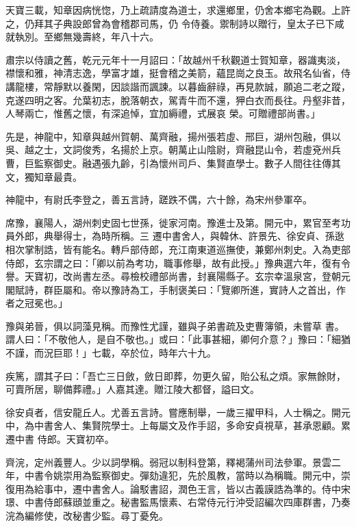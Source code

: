 \begin{pinyinscope}
 天寶三載，知章因病恍惚，乃上疏請度為道士，求還鄉里，仍舍本鄉宅為觀。上許之，仍拜其子典設郎曾為會稽郡司馬，仍
 令侍養。禦制詩以贈行，皇太子已下咸就執別。至鄉無幾壽終，年八十六。



 肅宗以侍讀之舊，乾元元年十一月詔曰：「故越州千秋觀道士賀知章，器識夷淡，襟懷和雅，神清志逸，學富才雄，挺會稽之美箭，蘊昆崗之良玉。故飛名仙省，侍講龍樓，常靜默以養閑，因談諧而諷諫。以暮齒辭祿，再見款誠，願追二老之蹤，克遂四明之客。允葉初志，脫落朝衣，駕青牛而不還，狎白衣而長往。丹壑非昔，人琴兩亡，惟舊之懷，有深追悼，宜加縟禮，式展哀
 榮。可贈禮部尚書。」



 先是，神龍中，知章與越州賀朝、萬齊融，揚州張若虛、邢巨，湖州包融，俱以吳、越之士，文詞俊秀，名揚於上京。朝萬止山陰尉，齊融昆山令，若虛兗州兵曹，巨監察御史。融遇張九齡，引為懷州司戶、集賢直學士。數子人間往往傳其文，獨知章最貴。



 神龍中，有尉氏李登之，善五言詩，蹉跌不偶，六十餘，為宋州參軍卒。



 席豫，襄陽人，湖州刺史固七世孫，徙家河南。豫進士及第。開元中，累官至考功員外郎，典舉得士，為時所稱。三
 遷中書舍人，與韓休、許景先、徐安貞、孫逖相次掌制誥，皆有能名。轉戶部侍郎，充江南東道巡撫使，兼鄭州刺史。入為吏部侍郎，玄宗謂之曰：「卿以前為考功，職事修舉，故有此授。」豫典選六年，復有令譽。天寶初，改尚書左丞。尋檢校禮部尚書，封襄陽縣子。玄宗幸溫泉宮，登朝元閣賦詩，群臣屬和。帝以豫詩為工，手制褒美曰：「覽卿所進，實詩人之首出，作者之冠冕也。」



 豫與弟晉，俱以詞藻見稱。而豫性尤謹，雖與子弟書疏及吏曹簿領，未嘗草
 書。謂人曰：「不敬他人，是自不敬也。」或曰：「此事甚細，卿何介意？」豫曰：「細猶不謹，而況巨耶！」七載，卒於位，時年六十九。



 疾篤，謂其子曰：「吾亡三日斂，斂日即葬，勿更久留，貽公私之煩。家無餘財，可賣所居，聊備葬禮。」人嘉其達。贈江陵大都督，謚曰文。



 徐安貞者，信安龍丘人。尤善五言詩。嘗應制舉，一歲三擢甲科，人士稱之。開元中，為中書舍人、集賢院學士。上每屬文及作手詔，多命安貞視草，甚承恩顧。累遷中書
 侍郎。天寶初卒。



 齊浣，定州義豐人。少以詞學稱。弱冠以制科登第，釋褐蒲州司法參軍。景雲二年，中書令姚崇用為監察御史。彈劾違犯，先於風教，當時以為稱職。開元中，崇復用為給事中，遷中書舍人。論駁書詔，潤色王言，皆以古義謨誥為準的。侍中宋璟、中書侍郎蘇頲並重之。秘書監馬懷素、右常侍元行沖受詔編次四庫群書，乃奏浣為編修使，改秘書少監。尋丁憂免。




\end{pinyinscope}
